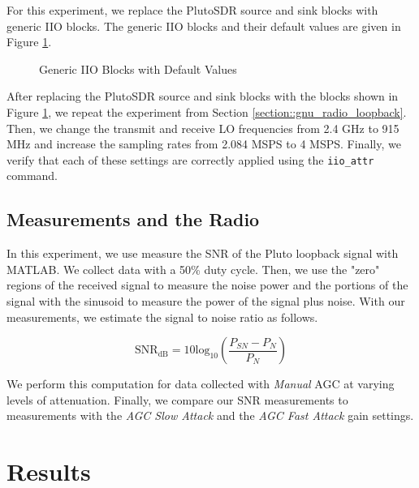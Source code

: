 \documentclass{article}
\begin{document}
For this experiment, we replace the PlutoSDR source and sink blocks with generic IIO blocks. The generic IIO blocks and their default values are given in Figure \ref{fig::generic_iio_blocks}.

\begin{figure}[H]
	\centerline{}
	\caption{Generic IIO Blocks with Default Values}
	\label{fig::generic_iio_blocks}
\end{figure}

After replacing the PlutoSDR source and sink blocks with the blocks shown in Figure \ref{fig::generic_iio_blocks}, we repeat the experiment from Section \ref{section::gnu_radio_loopback}. Then, we change the transmit and receive LO frequencies from 2.4 GHz to 915 MHz and increase the sampling rates from 2.084 MSPS to 4 MSPS. Finally, we verify that each of these settings are correctly applied using the \texttt{iio\_attr} command. 

\subsection{Measurements and the Radio}
\label{section::snr_measurement}

In this experiment, we use measure the SNR of the Pluto loopback signal with MATLAB. We collect data with a 50\% duty cycle. Then, we use the "zero" regions of the received signal to measure the noise power and the portions of the signal with the sinusoid to measure the power of the signal plus noise. With our measurements, we estimate the signal to noise ratio as follows.

\begin{equation}
	\text{SNR}_\text{dB} = 10\text{log}_{10}\left(\frac{P_{SN} - P_{N}}{P_{N}}\right)
	\label{eq::snr_estimate}
\end{equation}

We perform this computation for data collected with \textit{Manual} AGC at varying levels of attenuation. Finally, we compare our SNR measurements to measurements with the \textit{AGC Slow Attack} and the \textit{AGC Fast Attack} gain settings.

\section{Results}
\end{document}
